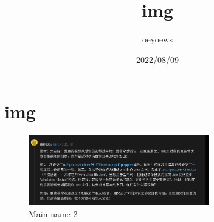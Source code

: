 \documentclass{article}
\title{img}
\author{oeyoews}
\date{2022/08/09}
\begin{document}
\maketitle


\section{img}%
\label{sec:img}

\begin{figure}[H] %
\centering %
\includegraphics[width=0.7\textwidth]{img/01.png} %
\caption{Main name 2} %
\label{Fig.main2} %
\end{figure}
\end{document}
